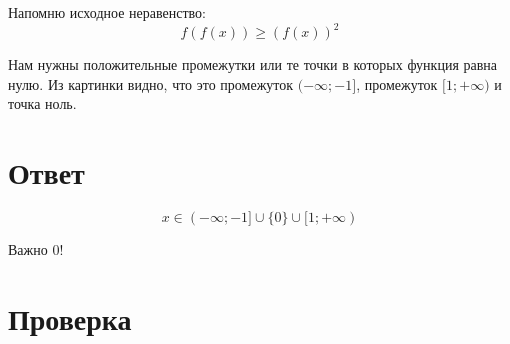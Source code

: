 \documentclass{article}
\begin{document}
Напомню исходное неравенство:
$$f(f(x))\ge{}(f(x))^2$$

Нам нужны положительные промежутки или те точки в которых функция равна нулю. Из картинки видно, что это промежуток $(-\infty;-1]$, промежуток $[1;+\infty)$ и точка ноль.

\section{Ответ}
$$x\in{}(-\infty;-1]\cup{}\{0\}\cup{}[1;+\infty)$$

Важно ${0}$!

\section{Проверка}
\end{document}
